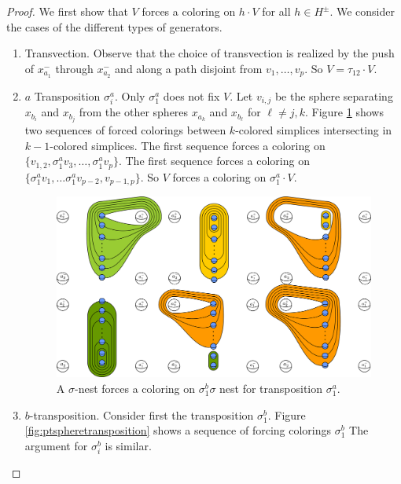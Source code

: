 \begin{proof}
  We first show that $V$ forces a coloring on $h \cdot V$ for all $h \in H^\pm$.
  We consider the cases of the different types of generators.
  \begin{enumerate}
    \item Transvection.
    Observe that the choice of transvection is realized by the push of $x^-_{a_1}$ through
    $x^-_{a_2}$ and along a path disjoint from $v_1,\ldots,v_p$.
    So $V = \tau_{12} \cdot V$.
    \item $a$ Transposition $\sigma_i^a$. Only $\sigma_1^a$ does not fix $V$.
    Let $v_{i,j}$ be the sphere separating $x_{b_i}$ and $x_{b_j}$
    from the other spheres $x_{a_k}$ and $x_{b_\ell}$ for $\ell \neq j,k$.
    Figure \ref{fig:ptspheretransposition2} shows two sequences of forced colorings between
    $k$-colored simplices intersecting in $k-1$-colored simplices.
    The first sequence forces a coloring on $\{v_{1,2},  \sigma_1^a v_3, \ldots, \sigma_1^a v_p\}$.
    The first sequence forces a coloring on $\{\sigma_1^a v_1, \ldots \sigma_1^a v_{p-2}, v_{p-1,p}\}$.
    So $V$ forces a coloring on $\sigma_1^a \cdot V$.

    \begin{figure}[h!]
      \centering
      \includegraphics[width=\textwidth]{figures/ptspheretransposition2.pdf}
      \caption{A $\sigma$-nest forces a coloring on $\sigma^b_1\sigma$ nest for transposition $\sigma^a_1$.}
      \label{fig:ptspheretransposition2}
    \end{figure}

    \item $b$-transposition.
    Consider first the transposition $\sigma^b_1$.
    Figure \ref{fig:ptspheretransposition} shows a sequence of forcing colorings $\sigma^b_1$
    The argument for $\sigma^b_i$ is similar.


\end{enumerate}
\end{proof}
